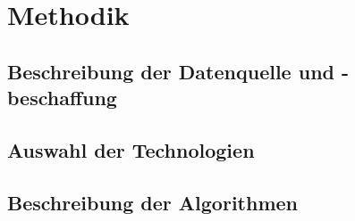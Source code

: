 \section{Methodik}

\subsection{Beschreibung der Datenquelle und -beschaffung}

\subsection{Auswahl der Technologien}

\subsection{Beschreibung der Algorithmen}